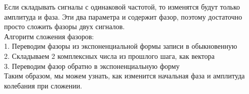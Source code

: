 
Если складывать сигналы с одинаковой частотой, то изменятся будут только амплитуда и фаза. Эти два параметра и содержит фазор, поэтому
достаточно просто сложить фазоры двух сигналов.\\

Алгоритм сложения фазоров: \\

1. Переводим фазоры из экспоненциальной формы записи в обыкновенную \\
2. Складываем 2 комплексных числа из прошлого шага, как вектора \\
3. Переводим фазор обратно в экспоненциальную форму \\

Таким образом, мы можем узнать, как изменится начальная фаза и амплитуда колебания при сложении.


\endinput